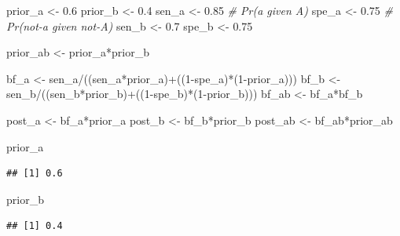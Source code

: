 \documentclass[
  10pt,
  dvipsnames,enabledeprecatedfontcommands]{scrartcl}
\newenvironment{Shaded}{\begin{snugshade}}{\end{snugshade}}
\newcommand{\CommentTok}[1]{\textcolor[rgb]{0.56,0.35,0.01}{\textit{#1}}}
\newcommand{\DecValTok}[1]{\textcolor[rgb]{0.00,0.00,0.81}{#1}}
\newcommand{\FloatTok}[1]{\textcolor[rgb]{0.00,0.00,0.81}{#1}}
\newcommand{\NormalTok}[1]{#1}
\newcommand{\OtherTok}[1]{\textcolor[rgb]{0.56,0.35,0.01}{#1}}
\newcommand{\SpecialCharTok}[1]{\textcolor[rgb]{0.00,0.00,0.00}{#1}}
\begin{document}
\begin{Shaded}
\begin{Highlighting}[]
\NormalTok{prior\_a }\OtherTok{\textless{}{-}} \FloatTok{0.6}
\NormalTok{prior\_b }\OtherTok{\textless{}{-}} \FloatTok{0.4}
\NormalTok{sen\_a }\OtherTok{\textless{}{-}} \FloatTok{0.85}  \CommentTok{\# Pr(a given A)}
\NormalTok{spe\_a }\OtherTok{\textless{}{-}} \FloatTok{0.75}  \CommentTok{\#  Pr(not{-}a given not{-}A)}
\NormalTok{sen\_b }\OtherTok{\textless{}{-}} \FloatTok{0.7}
\NormalTok{spe\_b }\OtherTok{\textless{}{-}} \FloatTok{0.75}

\NormalTok{prior\_ab }\OtherTok{\textless{}{-}}\NormalTok{ prior\_a}\SpecialCharTok{*}\NormalTok{prior\_b }

\NormalTok{bf\_a }\OtherTok{\textless{}{-}}\NormalTok{ sen\_a}\SpecialCharTok{/}\NormalTok{((sen\_a}\SpecialCharTok{*}\NormalTok{prior\_a)}\SpecialCharTok{+}\NormalTok{((}\DecValTok{1}\SpecialCharTok{{-}}\NormalTok{spe\_a)}\SpecialCharTok{*}\NormalTok{(}\DecValTok{1}\SpecialCharTok{{-}}\NormalTok{prior\_a)))}
\NormalTok{bf\_b }\OtherTok{\textless{}{-}}\NormalTok{ sen\_b}\SpecialCharTok{/}\NormalTok{((sen\_b}\SpecialCharTok{*}\NormalTok{prior\_b)}\SpecialCharTok{+}\NormalTok{((}\DecValTok{1}\SpecialCharTok{{-}}\NormalTok{spe\_b)}\SpecialCharTok{*}\NormalTok{(}\DecValTok{1}\SpecialCharTok{{-}}\NormalTok{prior\_b)))}
\NormalTok{bf\_ab }\OtherTok{\textless{}{-}}\NormalTok{ bf\_a}\SpecialCharTok{*}\NormalTok{bf\_b}

\NormalTok{post\_a }\OtherTok{\textless{}{-}}\NormalTok{ bf\_a}\SpecialCharTok{*}\NormalTok{prior\_a}
\NormalTok{post\_b }\OtherTok{\textless{}{-}}\NormalTok{ bf\_b}\SpecialCharTok{*}\NormalTok{prior\_b}
\NormalTok{post\_ab }\OtherTok{\textless{}{-}}\NormalTok{ bf\_ab}\SpecialCharTok{*}\NormalTok{prior\_ab}

\NormalTok{prior\_a}
\end{Highlighting}
\end{Shaded}

\begin{verbatim}
## [1] 0.6
\end{verbatim}

\begin{Shaded}
\begin{Highlighting}[]
\NormalTok{prior\_b}
\end{Highlighting}
\end{Shaded}

\begin{verbatim}
## [1] 0.4
\end{verbatim}
\end{document}
